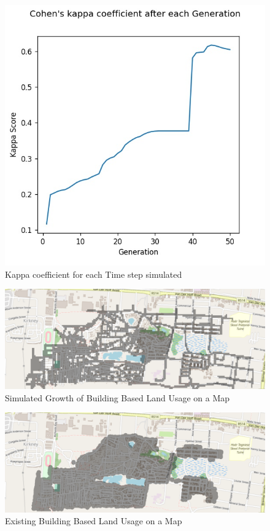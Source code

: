 \begin{figure}[H]
\centering
\includegraphics[scale=0.7]{Figures/Chapter4/scoresFigure}
\caption{Kappa coefficient for each Time step simulated}
\label{fig:scores}
\end{figure}

\begin{figure}[H]
\centering
\includegraphics[scale=0.3,angle=90]{Figures/Chapter4/Simulated}
\caption{Simulated Growth of Building Based Land Usage on a Map}
\label{fig:simmap}
\end{figure}

\begin{figure}[H]
\centering
\includegraphics[scale=0.3,angle=90]{Figures/Chapter4/Actual}
\caption{Existing Building Based Land Usage on a Map}
\label{fig:curmap}
\end{figure}



